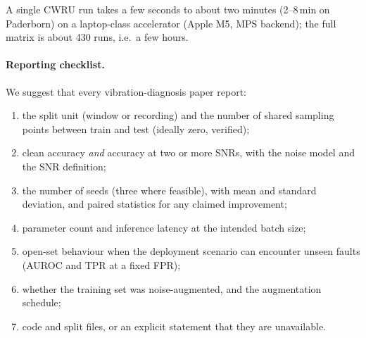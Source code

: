 A single CWRU run takes a few seconds to about two minutes (2--8\,min on Paderborn) on a laptop-class accelerator (Apple M5, MPS backend); the full matrix is about 430 runs, i.e.\ a few hours.

\paragraph{Reporting checklist.} We suggest that every vibration-diagnosis paper report:
\begin{enumerate}
\item the split unit (window or recording) and the number of shared sampling points between train and test (ideally zero, verified);
\item clean accuracy \emph{and} accuracy at two or more SNRs, with the noise model and the SNR definition;
\item the number of seeds (three where feasible), with mean and standard deviation, and paired statistics for any claimed improvement;
\item parameter count and inference latency at the intended batch size;
\item open-set behaviour when the deployment scenario can encounter unseen faults (AUROC and TPR at a fixed FPR);
\item whether the training set was noise-augmented, and the augmentation schedule;
\item code and split files, or an explicit statement that they are unavailable.
\end{enumerate}

\begingroup\footnotesize\setlength{\bibsep}{0pt}


\endgroup


